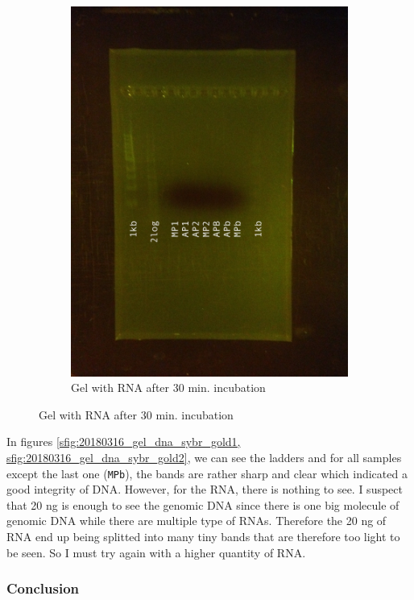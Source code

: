 \begin{figure}[H]
\begin{subfigure}[b]{0.24\textwidth}
        \includegraphics[width=\textwidth]{graphics/pic/20180316_gel_rna_sybr_gold.JPG}
        \caption{Gel with RNA after 30 min. incubation}
        \label{sfig:20180316_gel_rna_sybr_gold}
    \end{subfigure}
\end{figure}

In figures \ref{sfig:20180316_gel_dna_sybr_gold1, sfig:20180316_gel_dna_sybr_gold2}, we can see the ladders and for all samples except the last one (\texttt{MPb}), the bands are rather sharp and clear which indicated a good integrity of DNA. However, for the RNA, there is nothing to see. I suspect that 20 ng is enough to see the genomic DNA since there is one big molecule of genomic DNA while there are multiple type of RNAs. Therefore the 20 ng of RNA end up being splitted into many tiny bands that are therefore too light to be seen. So I must try again with a higher quantity of RNA. 

\subsubsection{Conclusion}

